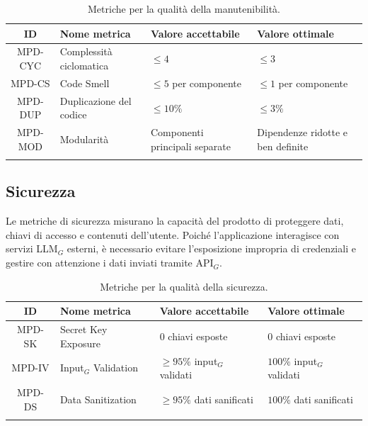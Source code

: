 \documentclass[a4paper, 10pt, colorlinks=true, linkcolor=black, urlcolor=blue, citecolor=blue, hidelinks]{article}
\begin{document}
\begingroup
\small
\renewcommand{\arraystretch}{1.25}
\begin{longtable}{|c|p{4cm}|p{3cm}|p{3cm}|}
    \hline
    \textbf{ID} & \textbf{Nome metrica} & \textbf{Valore accettabile} & \textbf{Valore ottimale} \\
    \hline
    \endhead

    MPD-CYC & Complessità ciclomatica & $\leq 4$ & $\leq 3$ \\ \hline
    MPD-CS & Code Smell & $\leq 5$ per componente & $\leq 1$ per componente \\ \hline
    MPD-DUP & Duplicazione del codice & $\leq 10\%$ & $\leq 3\%$ \\ \hline
    MPD-MOD & Modularità & Componenti principali separate & Dipendenze ridotte e ben definite \\ \hline

    \caption{Metriche per la qualità della manutenibilità.}
    \label{tab:metriche-manutenibilita}
\end{longtable}
\endgroup

\subsection{Sicurezza}

Le metriche di sicurezza misurano la capacità del prodotto di proteggere dati, chiavi di accesso e contenuti dell'utente. Poiché l'applicazione interagisce con servizi LLM$_G$ esterni, è necessario evitare l'esposizione impropria di credenziali e gestire con attenzione i dati inviati tramite API$_G$.

\begingroup
\small
\renewcommand{\arraystretch}{1.25}
\begin{longtable}{|c|p{4cm}|p{3cm}|p{3cm}|}
    \hline
    \textbf{ID} & \textbf{Nome metrica} & \textbf{Valore accettabile} & \textbf{Valore ottimale} \\
    \hline
    \endhead

    MPD-SK & Secret Key Exposure & $0$ chiavi esposte & $0$ chiavi esposte \\ \hline
    MPD-IV & Input$_G$ Validation & $\geq 95\%$ input$_G$ validati & $100\%$ input$_G$ validati \\ \hline
    MPD-DS & Data Sanitization & $\geq 95\%$ dati sanificati & $100\%$ dati sanificati \\ \hline

    \caption{Metriche per la qualità della sicurezza.}
    \label{tab:metriche-sicurezza}
\end{longtable}
\endgroup
\end{document}
